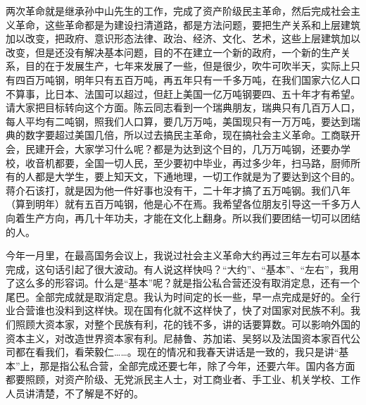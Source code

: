 两次革命就是继承孙中山先生的工作，完成了资产阶级民主革命，然后完成社会主义革命，这些革命都是为建设扫清道路，都是方法问题，要把生产关系和上层建筑加以改变，把政府、意识形态法律、政治、经济、文化、艺术，这些上层建筑加以改变，但是还没有解决基本问题，目的不在建立一个新的政府，一个新的生产关系，目的在于发展生产，七年来发展了一些，但是很少，吹牛可吹半天，实际上只有四百万吨钢，明年只有五百万吨，再五年只有一千多万吨，在我们国家六亿人口不算事，比日本、法国可以超过，但赶上美国一亿万吨钢要四、五十年才有希望。请大家把目标转向这个方面。陈云同志看到一个瑞典朋友，瑞典只有几百万人口，每人平均有二吨钢，照我们人口算，要几万万吨，美国现只有一万万吨，要达到瑞典的数字要超过美国几倍，所以过去搞民主革命，现在搞社会主义革命。工商联开会，民建开会，大家学习什么呢？都是为达到这个目的，几万万吨钢，还要办学校，收音机都要，全国一切人民，至少要初中毕业，再过多少年，扫马路，厨师所有的人都是大学生，要上知天文，下通地理，一切工作就是为了要达到这个目的。蒋介石该打，就是因为他一件好事也没有干，二十年才搞了五万吨钢。我们八年（算到明年）就有五百万吨钢，他是心不在焉。我希望各位朋友引导这一千多万人向着生产方向，再几十年功夫，才能在文化上翻身。所以我们要团结一切可以团结的人。

今年一月里，在最高国务会议上，我说过社会主义革命大约再过三年左右可以基本完成，这句话引起了很大波动。有人说这样快吗？“大约”、“基本”、“左右”，我用了这么多的形容词。什么是“基本”呢？就是指公私合营还没有取消定息，还有一个尾巴。全部完成就是取消定息。我认为时间定的长一些，早一点完成是好的。全行业合营谁也没料到这样快。现在国有化就不这样快了，快了对国家对民族不利。我们照顾大资本家，对整个民族有利，花的钱不多，讲的话要算数。可以影响外国的资本主义，对改造世界资本家有利。尼赫鲁、苏加诺、吴努以及法国资本家百代公司都在看我们，看荣毅仁……。现在的情况和我春天讲话是一致的，我只是讲“基本”上，那是指公私合营，全部完成还要七年，除了今年，还要六年。国内各方面都要照顾，对资产阶级、无党派民主人士，对工商业者、手工业、机关学校、工作人员讲清楚，不了解是不好的。


